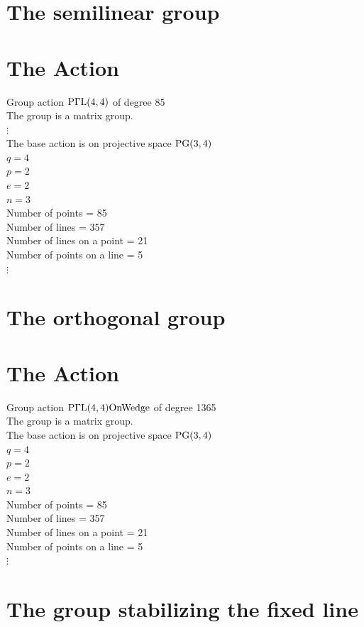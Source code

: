 \section*{The semilinear group}
\section*{The Action}
Group action ${\rm P}\Gamma {\rm L}(4,4)$ of degree 85\\
The group is a matrix group.\\
$\vdots$\\
The base action is on projective space ${\rm PG}(3, 4)$\\
$q = 4$\\
$p = 2$\\
$e = 2$\\
$n = 3$\\
Number of points = 85\\
Number of lines = 357\\
Number of lines on a point = 21\\
Number of points on a line = 5\\
$\vdots$\\\section*{The orthogonal group}
\section*{The Action}
Group action ${\rm P}\Gamma {\rm L}(4,4) {\rm OnWedge}$ of degree 1365\\
The group is a matrix group.\\
The base action is on projective space ${\rm PG}(3, 4)$\\
$q = 4$\\
$p = 2$\\
$e = 2$\\
$n = 3$\\
Number of points = 85\\
Number of lines = 357\\
Number of lines on a point = 21\\
Number of points on a line = 5\\
$\vdots$\\
\section*{The group stabilizing the fixed line}
